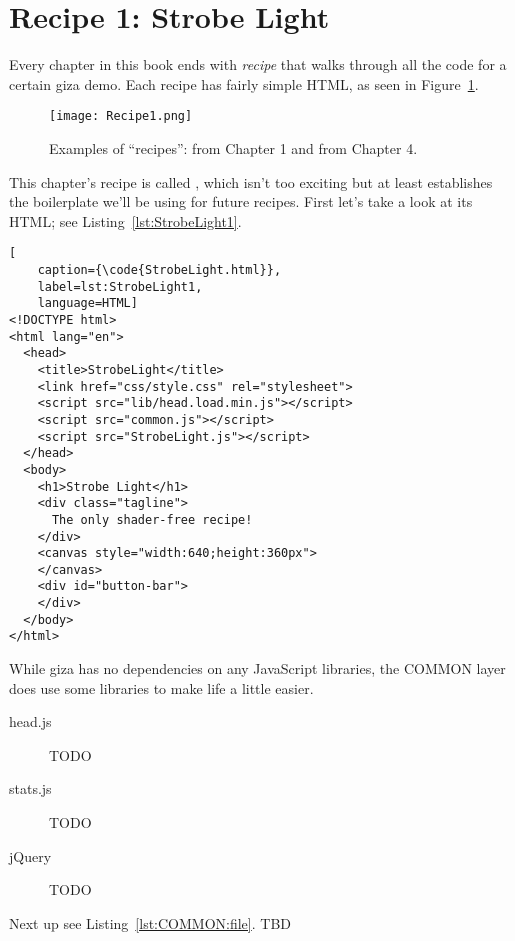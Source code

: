 \section{Recipe 1: Strobe Light}

Every chapter in this book ends with \emph{recipe} that walks through all the code for a certain giza demo.  Each recipe has fairly simple HTML, as seen in Figure~\ref{fig:Recipe1}.

\begin{figure}[htb]\centering
  \texttt{[image: Recipe1.png]}
  \caption{Examples of ``recipes'':  from Chapter 1 and  from Chapter 4.}
  \label{fig:Recipe1}
\end{figure}

This chapter's recipe is called , which isn't too exciting but at least establishes the boilerplate we'll be using for future recipes.  First let's take a look at its HTML; see Listing~\ref{lst:StrobeLight1}.

\begin{lstlisting}[
    caption={\code{StrobeLight.html}},
    label=lst:StrobeLight1,
    language=HTML]
<!DOCTYPE html>
<html lang="en">
  <head>
    <title>StrobeLight</title>
    <link href="css/style.css" rel="stylesheet">
    <script src="lib/head.load.min.js"></script>
    <script src="common.js"></script>
    <script src="StrobeLight.js"></script>
  </head>
  <body>
    <h1>Strobe Light</h1>
    <div class="tagline">
      The only shader-free recipe!
    </div>
    <canvas style="width:640;height:360px">
    </canvas>
    <div id="button-bar">
    </div>
  </body>
</html>
\end{lstlisting} 

While giza has no dependencies on any JavaScript libraries, the COMMON layer does use some libraries to make life a little easier.

\begin{description}
\item[head.js] TODO 
\item[stats.js] TODO
\item[jQuery] TODO
\end{description}

Next up see Listing~\ref{lst:COMMON:file}.  TBD

